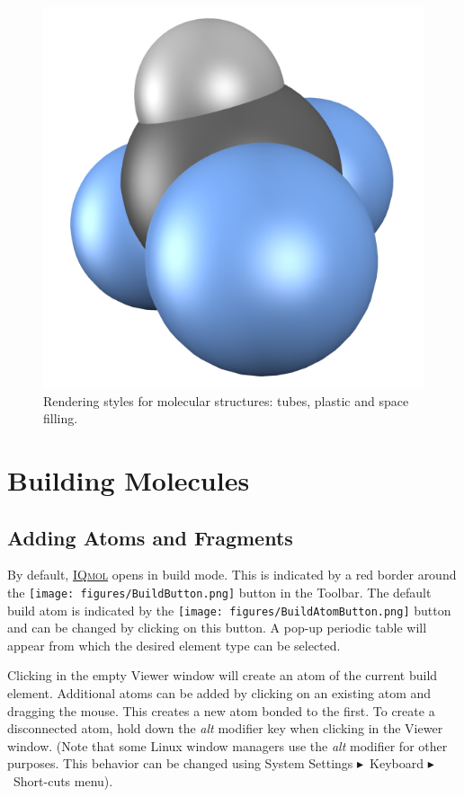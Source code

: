 \documentclass[a4paper,12pt]{article}
\newcommand{\iqmol}{\href{http://iqmol.org}{{\scshape IQmol}}}
\newcommand{\bt}{\ensuremath{\blacktriangleright}}
\begin{document}
\begin{figure}[h]
\begin{center}
\includegraphics[scale=0.20]{figures/CHF3-space.png}
\caption{Rendering styles for molecular structures: tubes, plastic and space filling.}
\label{fig:styles}
\end{center}
\end{figure}


\newpage
\section{Building Molecules}


\subsection{Adding Atoms and Fragments}

By default, \iqmol{} opens in build mode.  This is indicated by a red border
around the \texttt{[image: figures/BuildButton.png]} button in the
Toolbar.   The default build atom is indicated by the
\texttt{[image: figures/BuildAtomButton.png]} button and can be changed
by clicking on this button.  A pop-up periodic table will appear from which the
desired element type can be selected.

Clicking in the empty Viewer window will create an atom of the current build
element. Additional atoms can be added by clicking on an existing atom and
dragging the mouse.  This creates a new atom bonded to the first.  To create a
disconnected atom, hold down the \emph{alt} modifier key when clicking in the
Viewer window.  (Note that some Linux window managers use the \emph{alt} modifier
for other purposes.  This behavior can be changed using System Settings 
\bt\ Keyboard \bt\ Short-cuts menu).
\end{document}
